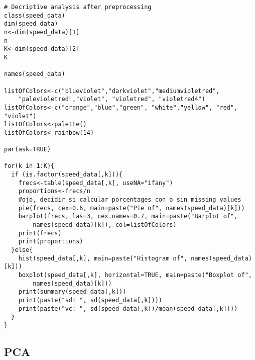 \begin{verbatim}
# Decriptive analysis after preprocessing
class(speed_data)
dim(speed_data)
n<-dim(speed_data)[1]
n
K<-dim(speed_data)[2]
K

names(speed_data)

listOfColors<-c("blueviolet","darkviolet","mediumvioletred", 
    "palevioletred","violet", "violetred", "violetred4")
listOfColors<-c("orange","blue","green", "white","yellow", "red", "violet")
listOfColors<-palette()
listOfColors<-rainbow(14)

par(ask=TRUE)

for(k in 1:K){
  if (is.factor(speed_data[,k])){ 
    frecs<-table(speed_data[,k], useNA="ifany")
    proportions<-frecs/n
    #ojo, decidir si calcular porcentages con o sin missing values
    pie(frecs, cex=0.6, main=paste("Pie of", names(speed_data)[k]))
    barplot(frecs, las=3, cex.names=0.7, main=paste("Barplot of", 
        names(speed_data)[k]), col=listOfColors)
    print(frecs)
    print(proportions)
  }else{
    hist(speed_data[,k], main=paste("Histogram of", names(speed_data)[k]))
    boxplot(speed_data[,k], horizontal=TRUE, main=paste("Boxplot of", 
        names(speed_data)[k]))
    print(summary(speed_data[,k]))
    print(paste("sd: ", sd(speed_data[,k])))
    print(paste("vc: ", sd(speed_data[,k])/mean(speed_data[,k])))
  }
}

\end{verbatim}

\subsection{PCA}


